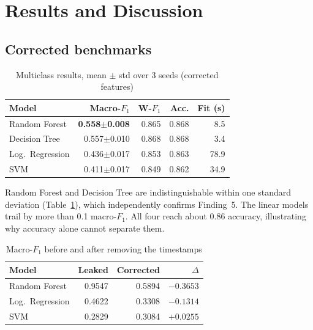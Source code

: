\documentclass[conference]{IEEEtran}
\begin{document}
\section{Results and Discussion}
\label{sec:results}

\subsection{Corrected benchmarks}

\begin{table}[!t]
\caption{Multiclass results, mean $\pm$ std over 3 seeds (corrected features)}
\label{tab:results}
\centering
\footnotesize
\begin{tabular}{@{}lrrrr@{}}
\toprule
\textbf{Model} & \textbf{Macro-$F_1$} & \textbf{W-$F_1$} & \textbf{Acc.} & \textbf{Fit (s)} \\
\midrule
Random Forest & \textbf{0.558$\pm$0.008} & 0.865 & 0.868 & 8.5 \\
Decision Tree & 0.557$\pm$0.010 & 0.868 & 0.868 & 3.4 \\
Log.\ Regression & 0.436$\pm$0.017 & 0.853 & 0.863 & 78.9 \\
SVM & 0.411$\pm$0.017 & 0.849 & 0.862 & 34.9 \\
\bottomrule
\end{tabular}
\end{table}

Random Forest and Decision Tree are indistinguishable within one standard deviation (Table~\ref{tab:results}), which independently confirms Finding~5. The linear models trail by more than 0.1 macro-$F_1$. All four reach about 0.86 accuracy, illustrating why accuracy alone cannot separate them.

\begin{table}[!t]
\caption{Macro-$F_1$ before and after removing the timestamps}
\label{tab:leakeffect}
\centering
\footnotesize
\begin{tabular}{@{}lrrr@{}}
\toprule
\textbf{Model} & \textbf{Leaked} & \textbf{Corrected} & \textbf{$\Delta$} \\
\midrule
Random Forest & 0.9547 & 0.5894 & $\mathbf{-0.3653}$ \\
Log.\ Regression & 0.4622 & 0.3308 & $-0.1314$ \\
SVM & 0.2829 & 0.3084 & $+0.0255$ \\
\bottomrule
\end{tabular}
\end{table}
\end{document}

